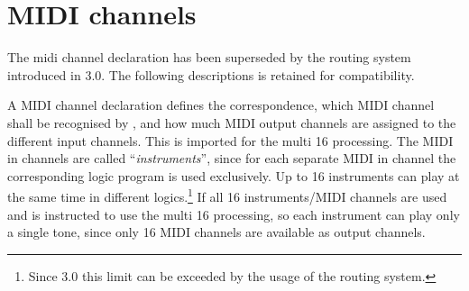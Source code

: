 \iffalse
MIDI-Ausgaben werden mit dem Wort {\it MIDIOUT}\index{MIDIOUT}
 eingeleitet und
sind eine eingeklammerte Folge von Zahlen. Bei Zahlen ist die sedezimale
Schreibweise zulässig (\#{\it ziffern}). Die Zahlen
müssen im Bereich von 0 bis 255 liegen, also Bytes sein. Es erfolgt keine
Kontrolle, ob es sich um eine sinnvolle MIDI-Nachricht handelt.
\fi



\chapter{MIDI channels}\label{cha:midi-kanale}
\label{MIDICHANNEL}

The midi channel declaration has been superseded by the routing system
introduced in \mutabor{} 3.0. The following descriptions is retained
for compatibility.

A MIDI channel declaration defines the correspondence, which MIDI
channel shall be recognised by \mutabor{}, and how much MIDI output
channels are assigned to the different input channels. This is
imported for the multi 16 processing. The
MIDI in channels are called “\textit{instruments}”, since for each separate
MIDI in channel the corresponding logic program is used
exclusively. Up to 16 instruments can play at the same time in
different logics.\footnote{Since \mutabor{} 3.0 this limit can be
  exceeded by the usage of the routing system.} If all 16
instruments/MIDI channels are used and \mutabor{} is instructed to use
the multi 16 processing, so each instrument can play only a single
tone, since only 16 MIDI channels are available as output channels. 

\iffalse
Eine MIDI-Kanal-Deklaration definiert die Zuordnung, auf welchen
MIDI-In-Kanal \mutabor{} reagieren soll, und wieviele MIDI-Out-Kanäle
den einzelnen Eingabekanälen zugeordnet werden. Dies ist für die
Tonerzeugung nach dem Multi-16-Verfahren\index{Multi-16-Verfahren}
 nötig. Wird als
Synthesizer-Treiber das Modell FB-01\index{FB-01} eingestellt, so gilt nur
die Angabe des MIDI-In-Kanals, der Ausgabekanal wird ignoriert.
Die MIDI-In-Kanäle werden auch als {\it Instrumente} bezeichnet, da
für jeden MIDI-In-Kanal separat das gesamte Logikprogramm gilt.
Es können bis zu 16 Instrumente gleichzeitig und in
verschiedenen Logiken spielen.
Werden alle 16 Instrumente/MIDI-Kanäle
und das Multi-16-Verfahren benutzt, so kann jedes Instrument nur
noch einen einzigen
Ton gleichzeitig spielen, da nicht mehr als eben diese 16 Midikanäle
auch als Ausgabe-Kanäle verfügbar sind. Beim Modell FB-01 von Yamaha wird
eine spezielle System-exklusive Ansteuerungsmethode verwendet,
so daß hier bis zu 16 Instrumente zu je 16 gleichzeitigen Tönen
spielbar sind.
\fi

